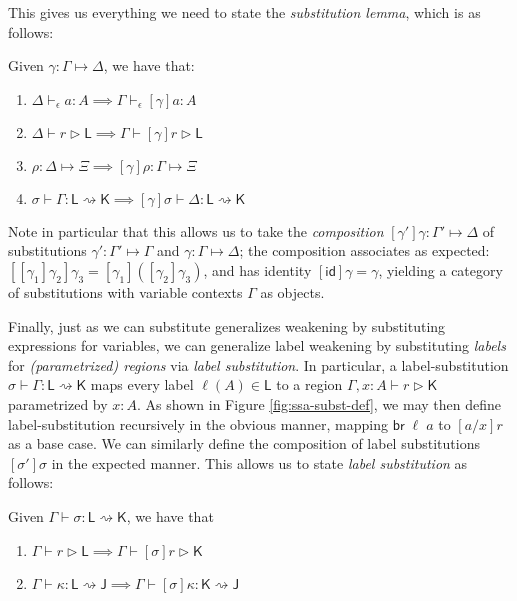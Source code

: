 \documentclass[acmsmall,screen,review]{acmart}
\newcounter{todos}
\newcommand{\todo}[1]{\stepcounter{todos} \textcolor{red}{TODO \arabic{todos}: #1}}
\newcommand{\ms}[1]{\ensuremath{\mathsf{#1}}}
\newcommand{\hasty}[4]{#1 \vdash_{#2} #3: {#4}}
\newcommand{\haslb}[3]{#1 \vdash #2 \rhd #3}
\newcommand{\issubst}[3]{#1: #2 \mapsto #3}
\newcommand{\lbsubst}[4]{#1 \vdash #2: #3 \rightsquigarrow #4}
\begin{document}
This gives us everything we need to state the \emph{substitution lemma}, which
is as follows:
\begin{lemma}[Substitution]
  Given $\issubst{\gamma}{\Gamma}{\Delta}$, we have that:
  \begin{enumerate}[label=(\alph*)]
    \item $\hasty{\Delta}{\epsilon}{a}{A} \implies \hasty{\Gamma}{\epsilon}{[\gamma]a}{A}$ 
    \item $\haslb{\Delta}{r}{\ms{L}} \implies \haslb{\Gamma}{[\gamma]r}{\ms{L}}$
    \item $\issubst{\rho}{\Delta}{\Xi} \implies \issubst{[\gamma]\rho}{\Gamma}{\Xi}$
    \item $\lbsubst{\sigma}{\Gamma}{\ms{L}}{\ms{K}} \implies \lbsubst{[\gamma]\sigma}{\Delta}{\ms{L}}{\ms{K}}$
  \end{enumerate}
\end{lemma}
Note in particular that this allows us to take the \emph{composition}
$\issubst{[\gamma']\gamma}{\Gamma'}{\Delta}$ of substitutions
$\issubst{\gamma'}{\Gamma'}{\Gamma}$ and $\issubst{\gamma}{\Gamma}{\Delta}$; the
composition associates as expected: $[[\gamma_1]\gamma_2]\gamma_3 =
[\gamma_1]([\gamma_2]\gamma_3)$, and has identity $[\ms{id}]\gamma = \gamma$,
yielding a category of substitutions with variable contexts $\Gamma$ as objects.

Finally, just as we can substitute generalizes weakening by substituting
expressions for variables, we can generalize label weakening by substituting
\emph{labels} for \emph{(parametrized) regions} via \emph{label substitution}.
In particular, a label-substitution $\lbsubst{\sigma}{\Gamma}{\ms{L}}{\ms{K}}$
maps every label $\ell(A) \in \ms{L}$ to a region $\haslb{\Gamma, x :
A}{r}{\ms{K}}$ parametrized by $x : A$. As shown in Figure
\ref{fig:ssa-subst-def}, we may then define label-substitution recursively in
the obvious manner, mapping $\ms{br}\;\ell\;a$ to $[a/x]r$ as a base case. We
can similarly define the composition of label substitutions $[\sigma']\sigma$ in
the expected manner. This allows us to state \emph{label substitution} as
follows:

\begin{lemma}
  Given $\lbsubst{\Gamma}{\sigma}{\ms{L}}{\ms{K}}$, we have that
  \begin{enumerate}[label=(\alph*)]
    \item $\haslb{\Gamma}{r}{\ms{L}} \implies \haslb{\Gamma}{[\sigma]r}{\ms{K}}$
    \item $\lbsubst{\Gamma}{\kappa}{\ms{L}}{\ms{J}} 
      \implies \lbsubst{\Gamma}{[\sigma]\kappa}{\ms{K}}{\ms{J}}$
  \end{enumerate}
\end{lemma}
\end{document}
